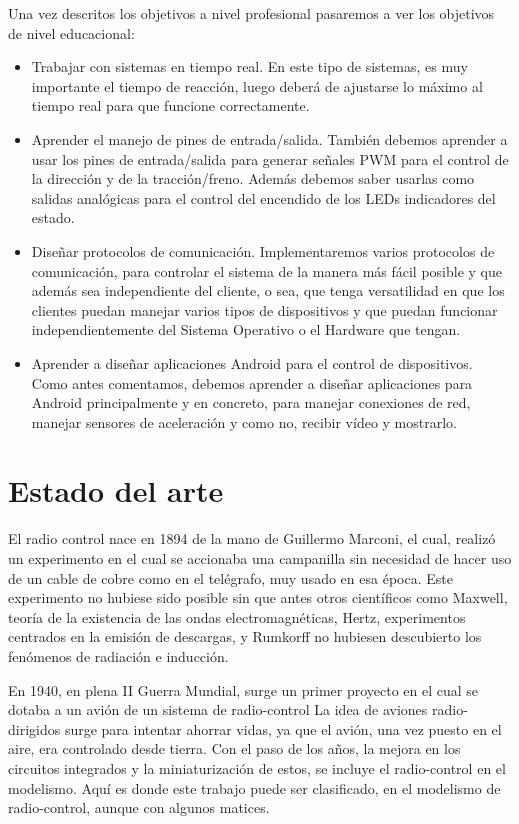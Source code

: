 \documentclass{pclass}
\begin{document}
Una vez descritos los objetivos a nivel profesional pasaremos a ver los objetivos de nivel educacional:
\begin{itemize}
	\item Trabajar con sistemas en tiempo real. En este tipo de sistemas, es muy importante el tiempo de reacción, luego deberá de ajustarse lo máximo al tiempo real para que funcione correctamente.
	
	\item Aprender el manejo de pines de entrada/salida. También debemos aprender a usar los pines de entrada/salida para generar señales PWM para el control de la dirección y de la tracción/freno. Además debemos saber usarlas como salidas analógicas para el control del encendido de los LEDs indicadores del estado.
	
	\item Diseñar protocolos de comunicación. Implementaremos varios protocolos de comunicación, para controlar el sistema de la manera más fácil posible y que además sea independiente del cliente, o sea, que tenga versatilidad en que los clientes puedan manejar varios tipos de dispositivos y que puedan funcionar independientemente del Sistema Operativo o el Hardware que tengan.
	
	\item Aprender a diseñar aplicaciones Android para el control de dispositivos. Como antes comentamos, debemos aprender a diseñar aplicaciones para Android principalmente y en concreto, para manejar conexiones de red, manejar sensores de aceleración y como no, recibir vídeo y mostrarlo.
	
\end{itemize}
\section{Estado del arte}
El radio control nace en 1894 de la mano de Guillermo Marconi, el cual, realizó un experimento en el cual se accionaba una campanilla sin necesidad de hacer uso de un cable de cobre como en el telégrafo, muy usado en esa época. Este experimento no hubiese sido posible sin que antes otros científicos como Maxwell, teoría de la existencia de las ondas electromagnéticas, Hertz, experimentos centrados en la emisión de descargas, y Rumkorff no hubiesen descubierto los fenómenos de radiación e inducción.

En 1940, en plena II Guerra Mundial, surge un primer proyecto en el cual se dotaba a un avión de un sistema de radio-control La idea de aviones radio-dirigidos surge para intentar ahorrar vidas, ya que el avión, una vez puesto en el aire, era controlado desde tierra. Con el paso de los años, la mejora en los circuitos integrados y la miniaturización de estos, se incluye el radio-control en el modelismo. Aquí es donde este trabajo puede ser clasificado, en el modelismo de radio-control, aunque con algunos matices.
\end{document}
